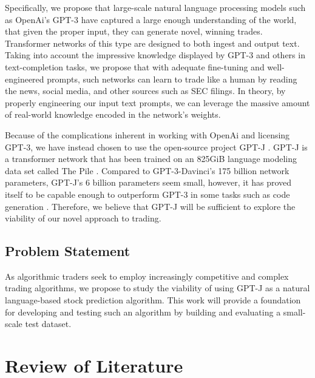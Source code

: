 \documentclass[conference]{IEEEtran}
\begin{document}
Specifically, we propose that large-scale natural language processing models such as OpenAi's GPT-3 \cite{Brown2020} have captured a large enough understanding of the world, that given the proper input, they can generate novel, winning trades. Transformer networks of this type are designed to both ingest and output text. Taking into account the impressive knowledge displayed by GPT-3 and others in text-completion tasks, we propose that with adequate fine-tuning and well-engineered prompts, such networks can learn to trade like a human by reading the news, social media, and other sources such as SEC filings. In theory, by properly engineering our input text prompts, we can leverage the massive amount of real-world knowledge encoded in the network's weights.

Because of the complications inherent in working with OpenAi and licensing GPT-3, we have instead chosen to use the open-source project GPT-J \cite{mesh-transformer-jax}. GPT-J is a transformer network \cite{Vaswani2017} that has been trained on an 825GiB language modeling data set called The Pile \cite{Gao2021}. Compared to GPT-3-Davinci's 175 billion network parameters, GPT-J's 6 billion parameters seem small, however, it has proved itself to be capable enough to outperform GPT-3 in some tasks such as code generation \cite{forefront}. Therefore, we believe that GPT-J will be sufficient to explore the viability of our novel approach to trading.

\subsection{Problem Statement}
As algorithmic traders seek to employ increasingly competitive and complex trading algorithms, we propose to study the viability of using GPT-J as a natural language-based stock prediction algorithm. This work will provide a foundation for developing and testing such an algorithm by building and evaluating a small-scale test dataset. 

\section{Review of Literature}
\end{document}
